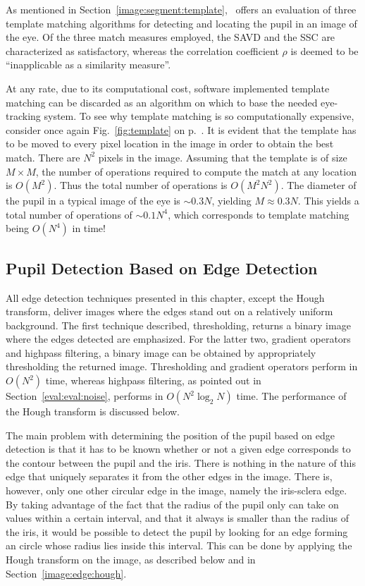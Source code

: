 As mentioned in Section~\ref{image:segment:template},~\cite{template}
offers an evaluation of three template matching algorithms for
detecting and locating the pupil in an image of the eye.  Of the three
match measures employed, the SAVD and the SSC are characterized as
satisfactory, whereas the correlation coefficient $\rho$ is deemed to
be ``inapplicable as a similarity measure''.

At any rate, due to its computational cost, software implemented
template matching can be discarded as an algorithm on which to base
the needed eye-tracking system.  To see why template matching is so
computationally expensive, consider once again Fig.~\ref{fig:template}
on p.~\pageref{fig:template}.  It is evident that the template has to
be moved to every pixel location in the image in order to obtain the
best match.  There are $N^{2}$ pixels in the image.  Assuming that the
template is of size $M\times M$, the number of operations required to
compute the match at any location is $O(M^{2})$.  Thus the total
number of operations is $O(M^{2}N^{2})$.  The diameter of the pupil in
a typical image of the eye is $\sim 0.3N$, yielding $M\approx 0.3N$.
This yields a total number of operations of $\sim 0.1N^{4}$, which
corresponds to template matching being $O(N^{4})$ in time!

\subsection{Pupil Detection Based on Edge Detection}
\label{eval:eval:edge}

All edge detection techniques presented in this chapter, except the
Hough transform, deliver images where the edges stand out on a
relatively uniform background.  The first technique described,
thresholding, returns a binary image where the edges detected are
emphasized.  For the latter two, gradient operators and highpass
filtering, a binary image can be obtained by appropriately
thresholding the returned image.  Thresholding and gradient operators
perform in $O(N^{2})$ time, whereas highpass filtering, as pointed out
in Section~\ref{eval:eval:noise}, performs in $O(N^{2}\log_{2}N)$
time.  The performance of the Hough transform is discussed below.

The main problem with determining the position of the pupil based on
edge detection is that it has to be known whether or not a given edge
corresponds to the contour between the pupil and the iris.  There is
nothing in the nature of this edge that uniquely separates it from the
other edges in the image.  There is, however, only one other circular
edge in the image, namely the iris-sclera edge.  By taking advantage
of the fact that the radius of the pupil only can take on values
within a certain interval, and that it always is smaller than the
radius of the iris, it would be possible to detect the pupil by
looking for an edge forming an circle whose radius lies inside this
interval.  This can be done by applying the Hough transform on the
image, as described below and in Section~\ref{image:edge:hough}.

